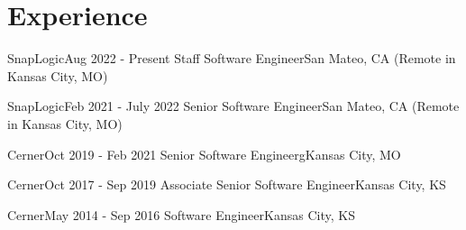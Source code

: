 \section{Experience}
\resumeSubHeadingListStart

    \resumeSubheading
    {SnapLogic}{Aug 2022 - Present}
    {Staff Software Engineer}{San Mateo, CA (Remote in Kansas City, MO)}
    \resumeItemListStart
        \resumeItem{}
    \resumeItemListEnd

    \resumeSubheading
    {SnapLogic}{Feb 2021 - July 2022}
    {Senior Software Engineer}{San Mateo, CA (Remote in Kansas City, MO)}
    \resumeItemListStart
        \resumeItem{}
    \resumeItemListEnd
    
    \resumeSubheading
    {Cerner}{Oct 2019 - Feb 2021}
    {Senior Software Engineerg}{Kansas City, MO}
    \resumeItemListStart
        \resumeItem{}
    \resumeItemListEnd

    \resumeSubheading
    {Cerner}{Oct 2017 - Sep 2019}
    {Associate Senior Software Engineer}{Kansas City, KS}
    \resumeItemListStart
        \resumeItem{}
    \resumeItemListEnd

    \resumeSubheading
    {Cerner}{May 2014 - Sep 2016}
    {Software Engineer}{Kansas City, KS}
    \resumeItemListStart
        \resumeItem{}
    \resumeItemListEnd





\resumeSubHeadingListEnd